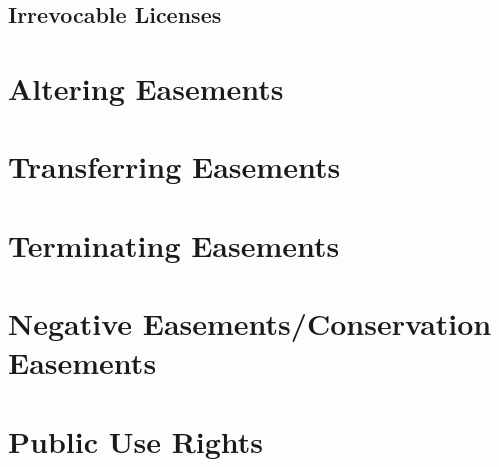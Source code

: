 




\begin{questions}

\end{questions}


\subsection{Irrevocable Licenses}





\begin{questions}

\end{questions}


\section{Altering Easements} 




\begin{questions}

\end{questions}






\begin{questions}

\end{questions}


\section{Transferring Easements}




\section{Terminating Easements}



\section{Negative Easements/Conservation Easements}





\section{Public Use Rights}










\begin{questions}

\end{questions}

